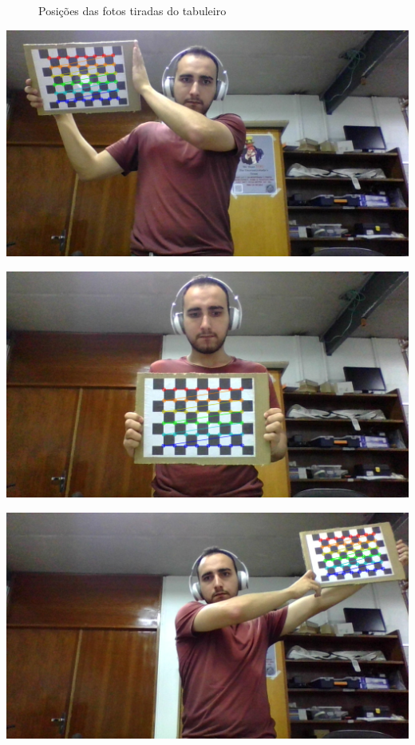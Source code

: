 \begin{figure}[!ht]
\caption{Posições das fotos tiradas do tabuleiro}
\end{figure}
\begin{minipage}{0.3\textwidth}
\centering
\includegraphics[width = \textwidth]{img/2.png}
\end{minipage}
\begin{minipage}{0.3\textwidth}
\centering
\includegraphics[width = \textwidth]{img/1.png}
\end{minipage}
\begin{minipage}{0.3\textwidth}
\centering
\includegraphics[width = \textwidth]{img/3.png}
\end{minipage}

